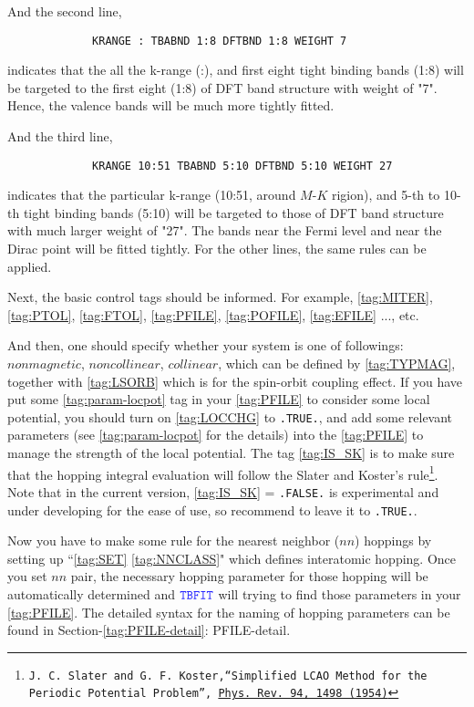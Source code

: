 \documentclass[a4paper,12pt]{scrartcl}
\newcommand{\tbfitname}{\textcolor{blue!85!white}{\texttt{TBFIT}}}
\begin{document}
			And the second line,
		    \begin{Verbatim}
             KRANGE : TBABND 1:8 DFTBND 1:8 WEIGHT 7
		    \end{Verbatim}
			indicates that the all the k-range (:), and first eight tight binding bands (1:8) will be targeted to the first eight (1:8) of DFT band structure with weight of "7". Hence, the valence bands will be much more tightly fitted.

			And the third line,
		    \begin{Verbatim}
             KRANGE 10:51 TBABND 5:10 DFTBND 5:10 WEIGHT 27
		    \end{Verbatim}
			indicates that the particular k-range (10:51, around $M$-$K$ rigion), and 5-th to 10-th tight binding bands (5:10) will be targeted to those of DFT band structure with much larger weight of "27". The bands near the Fermi level and near the Dirac point will be fitted tightly. For the other lines, the same rules can be applied. 
		
			Next, the basic control tags should be informed.
			For example, \ref{tag:MITER}, \ref{tag:PTOL}, \ref{tag:FTOL}, \ref{tag:PFILE}, \ref{tag:POFILE}, \ref{tag:EFILE} ..., etc.
			
			And then, one should specify whether your system is one of
			followings: $nonmagnetic$, $noncollinear$, $collinear$,
			which can be defined by \ref{tag:TYPMAG}, together with 
			\ref{tag:LSORB} which is for the spin-orbit coupling effect.
			If you have put some \ref{tag:param-locpot} tag in your \ref{tag:PFILE} to consider some local potential, you should turn on \ref{tag:LOCCHG} to \texttt{.TRUE.}, and add some relevant parameters (see \ref{tag:param-locpot} for the details) into the \ref{tag:PFILE} to manage the strength of the local potential. 
			The tag \ref{tag:IS_SK} is to make sure that the hopping integral evaluation will follow the Slater and Koster's rule\footnote{\texttt{J. C. Slater and G. F. Koster,``Simplified LCAO Method for the Periodic Potential Problem'',
		\href{https://journals.aps.org/pr/abstract/10.1103/PhysRev.94.1498}
		{Phys. Rev. 94, 1498 (1954)}}}. Note that in the current version, \ref{tag:IS_SK} = \texttt{.FALSE.} is experimental and under developing for the ease of use, so recommend to leave it to \texttt{.TRUE.}.
		
			Now you have to make some rule for the nearest neighbor ($nn$) hoppings by setting up ``\ref{tag:SET} \ref{tag:NNCLASS}" which defines interatomic hopping.
			Once you set $nn$ pair, the necessary hopping parameter for those hopping will be automatically determined and $\tbfitname$ will trying to find those parameters in your \ref{tag:PFILE}. The detailed syntax for the naming of hopping parameters can be found in Section-\ref{tag:PFILE-detail}: PFILE-detail. 
			
\end{document}
